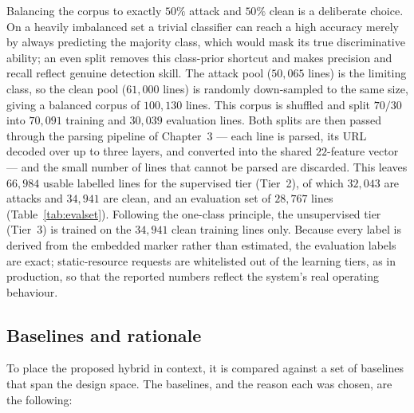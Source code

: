 \documentclass[../main.tex]{subfiles}
\begin{document}
Balancing the corpus to exactly $50\%$ attack and $50\%$ clean is a
deliberate choice. On a heavily imbalanced set a trivial classifier can reach
a high accuracy merely by always predicting the majority class, which would
mask its true discriminative ability; an even split removes this class-prior
shortcut and makes precision and recall reflect genuine detection skill. The
attack pool ($50{,}065$ lines) is the limiting class, so the clean pool
($61{,}000$ lines) is randomly down-sampled to the same size, giving a
balanced corpus of $100{,}130$ lines. This corpus is shuffled and split
$70/30$ into $70{,}091$ training and $30{,}039$ evaluation lines. Both splits
are then passed through the parsing pipeline of Chapter~3 --- each line is
parsed, its URL decoded over up to three layers, and converted into the shared
$22$-feature vector --- and the small number of lines that cannot be parsed
are discarded. This leaves $66{,}984$ usable labelled lines for the supervised
tier (Tier~2), of which $32{,}043$ are attacks and $34{,}941$ are clean, and an
evaluation set of $28{,}767$ lines (Table~\ref{tab:evalset}). Following the
one-class principle, the unsupervised tier (Tier~3) is trained on the
$34{,}941$ clean training lines only. Because every label is derived from the
embedded marker rather than estimated, the evaluation labels are exact;
static-resource requests are whitelisted out of the learning tiers, as in
production, so that the reported numbers reflect the system's real operating
behaviour.

\subsection{Baselines and rationale}
\label{sec:sim-baselines}

To place the proposed hybrid in context, it is compared against a set of
baselines that span the design space. The baselines, and the reason each was
chosen, are the following:
\end{document}
